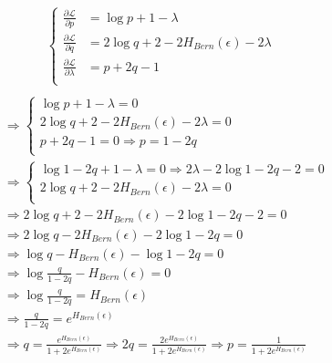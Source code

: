 \documentclass[
  course = {{EE623 Information Theory}},
  quartile = {{4}},
  assignment = 6,
  name = {{Mohammad Mahdi Rahimi}},
  studentnumber = {{20208244}},
  email = {{mahi@kaist.ac.kr}},
  firstexercise = 1
]{aga-homework}
\begin{document}
\begin{equation} \label{eq3}
\begin{split}
\begin{cases}
\frac{\partial\mathcal{L}}{\partial p} & = \log{p} + 1 - \lambda\\
\frac{\partial\mathcal{L}}{\partial q}  & = 2\log{q} + 2 - 2H_{Bern}(\epsilon) - 2\lambda\\
\frac{\partial\mathcal{L}}{\partial \lambda} & = p + 2q - 1\\
\end{cases}\\
\end{split}
\end{equation}
\begin{equation} \label{eq3}
\begin{split}
& \Rightarrow \begin{cases}
\log{p} + 1 - \lambda = 0\\
2\log{q} + 2 - 2H_{Bern}(\epsilon) - 2\lambda = 0\\
p + 2q - 1 = 0 \Rightarrow p = 1 - 2q\\
\end{cases}\\
& \Rightarrow \begin{cases}
\log{1 -2q} + 1 - \lambda = 0 \Rightarrow 2\lambda - 2\log{1 -2q} - 2 = 0\\
2\log{q} + 2 - 2H_{Bern}(\epsilon) - 2\lambda = 0\\
\end{cases}\\
&\Rightarrow 2\log{q} + 2 - 2H_{Bern}(\epsilon) - 2\log{1 -2q} - 2 = 0\\
&\Rightarrow 2\log{q} - 2H_{Bern}(\epsilon) - 2\log{1 -2q} = 0\\
&\Rightarrow \log{q} - H_{Bern}(\epsilon) - \log{1 -2q} = 0\\
&\Rightarrow \log{\frac{q}{1 -2q}} - H_{Bern}(\epsilon) = 0\\
&\Rightarrow \log{\frac{q}{1 -2q}} = H_{Bern}(\epsilon)\\
&\Rightarrow \frac{q}{1 -2q} = e^{H_{Bern}(\epsilon)}\\
&\Rightarrow q = \frac{e^{H_{Bern}(\epsilon)}}{1 + 2e^{H_{Bern}(\epsilon)}} \Rightarrow 2q = \frac{2e^{H_{Bern}(\epsilon)}}{1 + 2e^{H_{Bern}(\epsilon)}} \Rightarrow p = \frac{1}{1 + 2e^{H_{Bern}(\epsilon)}}\\
\end{split}
\end{equation}
\end{document}
